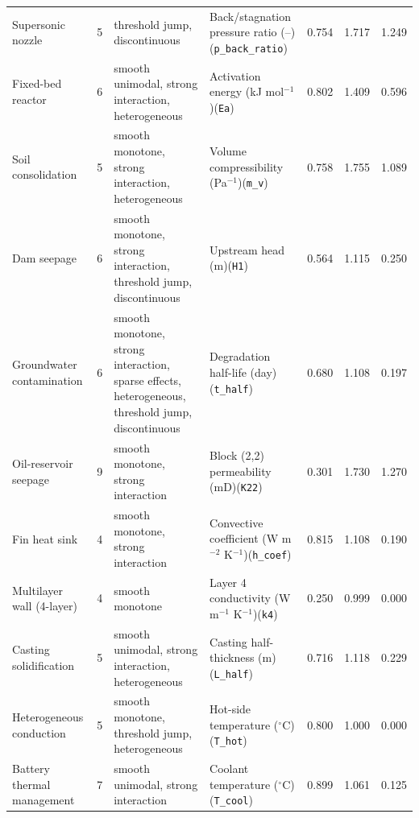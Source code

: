 \begin{longtable}{@{}>{\raggedright\arraybackslash}p{2.7cm}c>{\raggedright\arraybackslash}p{3.5cm}>{\raggedright\arraybackslash}p{3.9cm}rrr@{}}
Supersonic nozzle & 5 & threshold jump, discontinuous & Back/stagnation pressure ratio (--)\newline (\texttt{p\_back\_ratio}) & 0.754 & 1.717 & 1.249 \\
Fixed-bed reactor & 6 & smooth unimodal, strong interaction, heterogeneous & Activation energy (kJ mol$^{-1}$)\newline (\texttt{Ea}) & 0.802 & 1.409 & 0.596 \\
Soil consolidation & 5 & smooth monotone, strong interaction, heterogeneous & Volume compressibility (Pa$^{-1}$)\newline (\texttt{m\_v}) & 0.758 & 1.755 & 1.089 \\
Dam seepage & 6 & smooth monotone, strong interaction, threshold jump, discontinuous & Upstream head (m)\newline (\texttt{H1}) & 0.564 & 1.115 & 0.250 \\
Groundwater contamination & 6 & smooth monotone, strong interaction, sparse effects, heterogeneous, threshold jump, discontinuous & Degradation half-life (day)\newline (\texttt{t\_half}) & 0.680 & 1.108 & 0.197 \\
Oil-reservoir seepage & 9 & smooth monotone, strong interaction & Block (2,2) permeability (mD)\newline (\texttt{K22}) & 0.301 & 1.730 & 1.270 \\
Fin heat sink & 4 & smooth monotone, strong interaction & Convective coefficient (W m$^{-2}$ K$^{-1}$)\newline (\texttt{h\_coef}) & 0.815 & 1.108 & 0.190 \\
Multilayer wall (4-layer) & 4 & smooth monotone & Layer 4 conductivity (W m$^{-1}$ K$^{-1}$)\newline (\texttt{k4}) & 0.250 & 0.999 & 0.000 \\
Casting solidification & 5 & smooth unimodal, strong interaction, heterogeneous & Casting half-thickness (m)\newline (\texttt{L\_half}) & 0.716 & 1.118 & 0.229 \\
Heterogeneous conduction & 5 & smooth monotone, threshold jump, heterogeneous & Hot-side temperature ($^\circ$C)\newline (\texttt{T\_hot}) & 0.800 & 1.000 & 0.000 \\
Battery thermal management & 7 & smooth unimodal, strong interaction & Coolant temperature ($^\circ$C)\newline (\texttt{T\_cool}) & 0.899 & 1.061 & 0.125 \\

\end{longtable}
